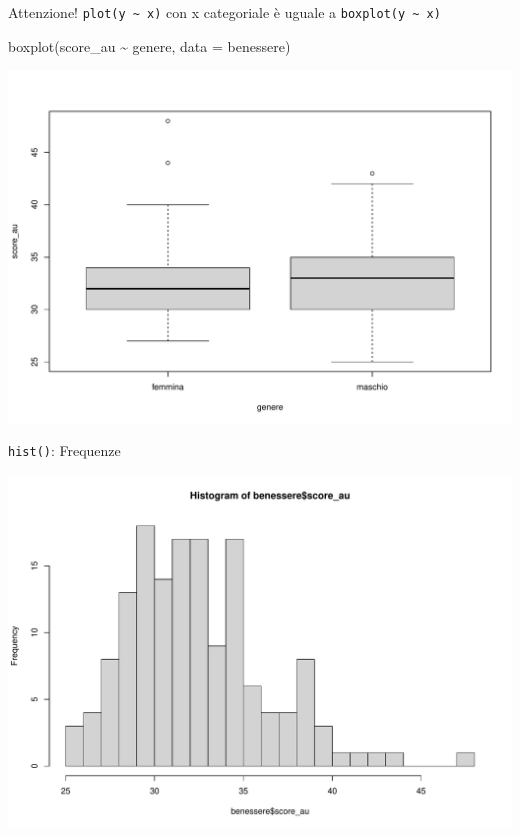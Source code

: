 \documentclass[
  ignorenonframetext,
]{beamer}
\newenvironment{Shaded}{\begin{snugshade}}{\end{snugshade}}
\newcommand{\AttributeTok}[1]{\textcolor[rgb]{0.00,0.34,0.68}{#1}}
\newcommand{\DecValTok}[1]{\textcolor[rgb]{0.69,0.50,0.00}{#1}}
\newcommand{\FunctionTok}[1]{\textcolor[rgb]{0.39,0.29,0.61}{#1}}
\newcommand{\NormalTok}[1]{\textcolor[rgb]{0.12,0.11,0.11}{#1}}
\newcommand{\SpecialCharTok}[1]{\textcolor[rgb]{0.24,0.68,0.91}{#1}}
\begin{document}
\begin{frame}[fragile]{Attenzione!}
\protect\hypertarget{attenzione}{}
\texttt{plot(y\ \textasciitilde{}\ x)} con x categoriale è uguale a
\texttt{boxplot(y\ \textasciitilde{}\ x)}

\begin{Shaded}
\begin{Highlighting}[]
\FunctionTok{boxplot}\NormalTok{(score\_au }\SpecialCharTok{\textasciitilde{}}\NormalTok{ genere, }\AttributeTok{data =}\NormalTok{ benessere)}
\end{Highlighting}
\end{Shaded}

\begin{center}\includegraphics[width=0.7\linewidth]{Practice_files/figure-beamer/unnamed-chunk-43-1} \end{center}
\end{frame}

\begin{frame}[fragile]{\texttt{hist()}: Frequenze}
\protect\hypertarget{hist-frequenze}{}
\scriptsize

\begin{Shaded}
\end{Shaded}

\begin{center}\includegraphics[width=0.7\linewidth]{Practice_files/figure-beamer/unnamed-chunk-44-1} \end{center}
\end{frame}
\end{document}
